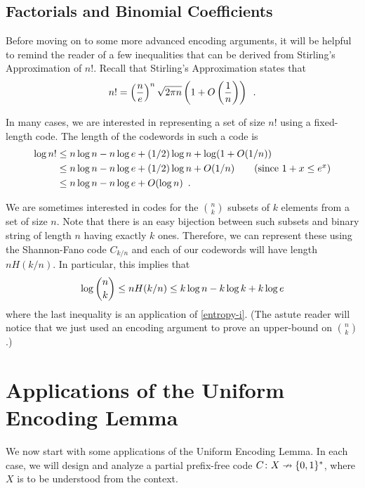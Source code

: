 \documentclass{patmorin}
\begin{document}
\subsection{Factorials and Binomial Coefficients}

Before moving on to some more advanced encoding arguments, it will
be helpful to remind the reader of a few inequalities that can be
derived from Stirling's Approximation of $n!$.  Recall that Stirling's
Approximation states that
\begin{equation}
  n! = \left(\frac{n}{e}\right)^n\sqrt{2\pi n}\left(1+O\left(\frac{1}{n}\right)\right) \enspace .
   \eqlabel{stirling}
\end{equation}

In many cases, we are interested in representing a set of size $n!$
using a fixed-length code.  The length of the codewords in such a code is
\begin{align}
  \log n!
  & \le n\log n - n\log e + (1/2)\log n + \log(1+O(1/n)) \notag \\
  & \le n\log n - n\log e + (1/2)\log n + O(1/n) \tag{since $1+x \le e^x$} \\
  & \le n\log n - n\log e + O(\log n) \eqlabel{stirling-loose}
  \enspace .
\end{align}

We are sometimes interested in codes for the $\binom{n}{k}$ subsets of
$k$ elements from a set of size $n$.  Note that there is an easy
bijection between such subsets and binary string of length $n$ having
exactly $k$ ones. Therefore, we can represent these using the
Shannon-Fano code $C_{k/n}$ and each of our codewords will have length
$nH(k/n)$.  In particular, this implies that
\begin{equation}
  \log\binom{n}{k} \le nH(k/n) \le k\log n - k\log k + k\log e 
  \eqlabel{log-n-choose-k}
\end{equation}
where the last inequality is an application of \eqref{entropy-i}. (The
astute reader will notice that we just used an encoding argument to
prove an upper-bound on $\binom{n}{k}$.)

\section{Applications of the Uniform Encoding Lemma}

We now start with some applications of the Uniform Encoding Lemma. In
each case, we will design and analyze a partial prefix-free code
$C\colon X\nrightarrow \{0, 1\}^*$, where $X$ is to be understood from
the context.
\end{document}
